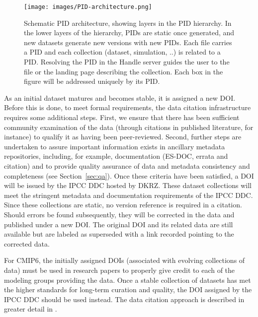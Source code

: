 \documentclass[gmd,manuscript]{copernicus}
\newcommand{\pllabel}[1]{\label{p-#1}\linelabel{l-#1}}
\begin{document}
\begin{figure*}
  \begin{center}
    \texttt{[image: images/PID-architecture.png]}
  \end{center}
  \caption{Schematic PID architecture, showing layers in the PID
    hierarchy. In the lower layers of the hierarchy, PIDs are static
    once generated, and new datasets generate new versions with new
    PIDs. Each file carries a PID and each collection (dataset,
    simulation, ..) is related to a PID. Resolving the PID in the
    Handle server guides the user to the file or the landing page
    describing the collection. Each box in the figure will be
    addressed uniquely by its PID.}
  \label{fig:pidarch}
\end{figure*}

As an initial dataset matures and becomes stable, it is assigned a new
DOI. Before this is done, to meet formal requirements, the data citation infrastructure
requires some additional steps.  First, we
ensure that there has been sufficient community examination of the
data
\pllabel{RC1-40}
(through citations in published literature, for instance) to qualify
it as having been peer-reviewed. Second, further steps are undertaken
to assure important information exists in ancillary metadata
repositories, including, for example, documentation (ES-DOC, errata
and citation) and to provide quality assurance of data and metadata
consistency and completeness (see Section~\ref{sec:qa}). Once these
criteria have been satisfied, a DOI will be issued by the IPCC DDC
hosted by DKRZ. These dataset collections will meet the stringent
metadata and documentation requirements of the IPCC DDC. Since these
collections are static, no version reference is required in a
citation.
\pllabel{RC1-41}
Should errors be found subsequently, they will be corrected in the
data and published under a new DOI. The original DOI and its related
data are still available but are labeled as superseded with a link recorded
pointing to the corrected data.

For CMIP6, the initially assigned DOIs (associated with evolving
collections of data) must be used in research papers to properly give
credit to each of the modeling groups providing the data. Once a
stable collection of datasets has met the higher standards for
long-term curation and quality, the DOI assigned by the IPCC DDC
should be used instead.
The data citation approach is described in greater detail in \cite{ref:stockhauselautenschlager2017}.
\end{document}
